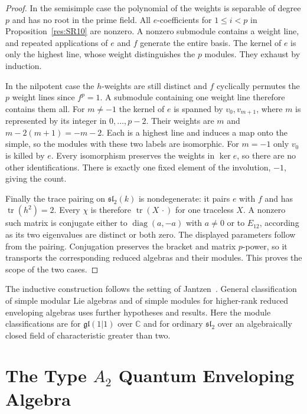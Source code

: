 \documentclass[11pt,oneside,openany]{book}
\theoremstyle{definition}
\theoremstyle{remark}
\begin{document}
\begin{proof}
In the semisimple case the polynomial of the weights is
separable of degree \(p\) and has no root in the prime field.
All \(e\)-coefficients for \(1\le i<p\) in
Proposition~\ref{res:SR10} are nonzero. A nonzero
submodule contains a weight line, and repeated applications
of \(e\) and \(f\) generate the entire basis. The kernel of
\(e\) is only the highest line, whose weight distinguishes
the \(p\) modules. They exhaust by induction.

In the nilpotent case the \(h\)-weights are still distinct
and \(f\) cyclically permutes the \(p\) weight lines since
\(f^p=1\). A submodule containing one weight line therefore
contains them all. For \(m\ne-1\) the kernel of \(e\) is
spanned by \(v_0,v_{m+1}\), where \(m\) is represented by
its integer in \(0,\ldots,p-2\). Their weights are \(m\)
and \(m-2(m+1)=-m-2\). Each is a highest line and induces
a map onto the simple, so the modules with these two labels
are isomorphic. For \(m=-1\) only \(v_0\) is killed by \(e\).
Every isomorphism preserves the weights in \(\ker e\), so
there are no other identifications. There is exactly one
fixed element of the involution, \(-1\), giving the count.

Finally the trace pairing on \(\mathfrak{sl}_2(k)\) is
nondegenerate: it pairs \(e\) with \(f\) and has
\(\operatorname{tr}(h^2)=2\). Every \(\chi\) is therefore
\(\operatorname{tr}(X\,\cdot)\) for one traceless \(X\).
A nonzero such matrix is conjugate either to
\(\operatorname{diag}(a,-a)\) with \(a\ne0\) or to
\(E_{12}\), according as its two eigenvalues are distinct
or both zero. The displayed parameters follow from the
pairing. Conjugation preserves the bracket and matrix
\(p\)-power, so it transports the corresponding reduced
algebras and their modules. This proves the scope of the
two cases.
\end{proof}

The inductive construction follows the setting of
Jantzen~\cite[Sections B.3--B.4, B.10 and C.3,
PDF pp.~6--7 and 9--11]{jantzen-modular}.
General classification of simple modular Lie algebras and of
simple modules for higher-rank reduced enveloping algebras
uses further hypotheses and results. Here the module
classifications are for \(\mathfrak{gl}(1|1)\) over
\(\mathbb C\) and for ordinary \(\mathfrak{sl}_2\) over an
algebraically closed field of characteristic greater than two.
\chapter[The Type A2 Quantum Enveloping Algebra]{The Type \(A_2\) Quantum Enveloping Algebra}
\label{ch:quantum-enveloping}
\end{document}
